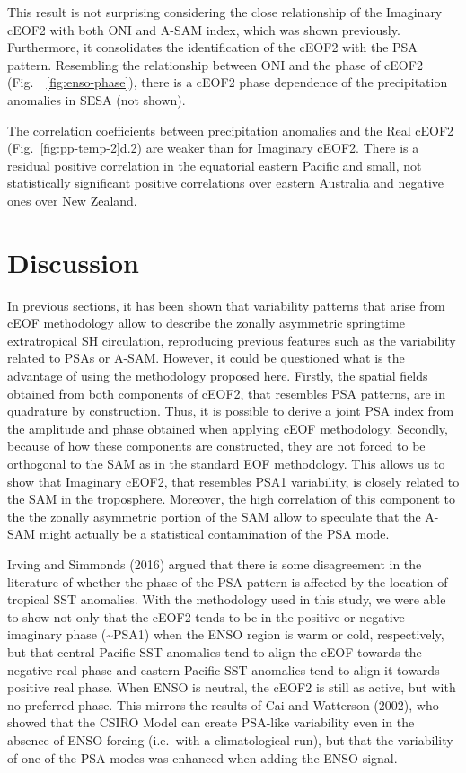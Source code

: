 \documentclass[smallextended]{svjour3}       %
\begin{document}
This result is not surprising considering the close relationship of the Imaginary cEOF2 with both ONI and A-SAM index, which was shown previously.\\
Furthermore, it consolidates the identification of the cEOF2 with the PSA pattern. Resembling the relationship between ONI and the phase of cEOF2 (Fig.~~\ref{fig:enso-phase}), there is a cEOF2 phase dependence of the precipitation anomalies in SESA (not shown).

The correlation coefficients between precipitation anomalies and the Real cEOF2 (Fig.~\ref{fig:pp-temp-2}d.2) are weaker than for Imaginary cEOF2.
There is a residual positive correlation in the equatorial eastern Pacific and small, not statistically significant positive correlations over eastern Australia and negative ones over New Zealand.

\hypertarget{discussion}{%
\section{Discussion}\label{discussion}}

In previous sections, it has been shown that variability patterns that arise from cEOF methodology allow to describe the zonally asymmetric springtime extratropical SH circulation, reproducing previous features such as the variability related to PSAs or A-SAM.
However, it could be questioned what is the advantage of using the methodology proposed here.
Firstly, the spatial fields obtained from both components of cEOF2, that resembles PSA patterns, are in quadrature by construction.
Thus, it is possible to derive a joint PSA index from the amplitude and phase obtained when applying cEOF methodology.
Secondly, because of how these components are constructed, they are not forced to be orthogonal to the SAM as in the standard EOF methodology.
This allows us to show that Imaginary cEOF2, that resembles PSA1 variability, is closely related to the SAM in the troposphere.
Moreover, the high correlation of this component to the the zonally asymmetric portion of the SAM allow to speculate that the A-SAM might actually be a statistical contamination of the PSA mode.

Irving and Simmonds (2016) argued that there is some disagreement in the literature of whether the phase of the PSA pattern is affected by the location of tropical SST anomalies.
With the methodology used in this study, we were able to show not only that the cEOF2 tends to be in the positive or negative imaginary phase (\textasciitilde PSA1) when the ENSO region is warm or cold, respectively, but that central Pacific SST anomalies tend to align the cEOF towards the negative real phase and eastern Pacific SST anomalies tend to align it towards positive real phase.
When ENSO is neutral, the cEOF2 is still as active, but with no preferred phase.
This mirrors the results of Cai and Watterson (2002), who showed that the CSIRO Model can create PSA-like variability even in the absence of ENSO forcing (i.e.~with a climatological run), but that the variability of one of the PSA modes was enhanced when adding the ENSO signal.
\end{document}
